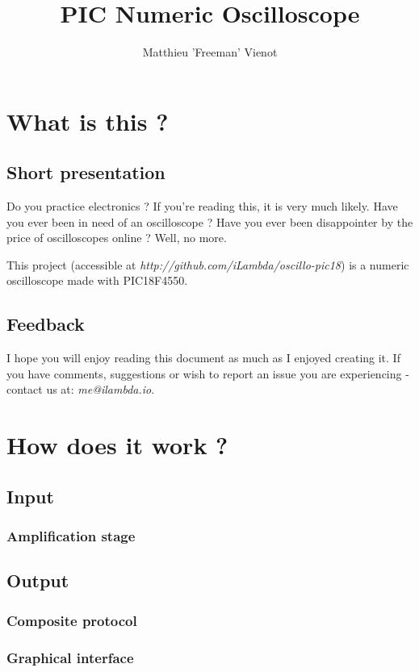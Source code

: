 \documentclass[11pt]{article}
\title{\textbf{PIC Numeric Oscilloscope}}
\author{Matthieu 'Freeman' Vienot}
\date{}
\begin{document}
\maketitle

\section{What is this ?}
\subsection {\Large\bfseries{Short presentation}}
Do you practice electronics ? If you're reading this, it is very much likely. Have you ever been in need of an oscilloscope ? Have you ever been disappointer by the price of oscilloscopes online ? Well, no more.

This project (accessible at \emph{http://github.com/iLambda/oscillo-pic18}) is a numeric oscilloscope made with PIC18F4550.

\subsection{Feedback}
I hope you will enjoy reading this document as much as I enjoyed creating it. If you have comments, suggestions or wish to report an issue you are experiencing - contact us at: \emph{me@ilambda.io}.

\section {How does it work ?}

\subsection{Input}

\subsubsection{Amplification stage}


\subsection{Output}

\subsubsection{Composite protocol}

\subsubsection{Graphical interface}
\end{document}
